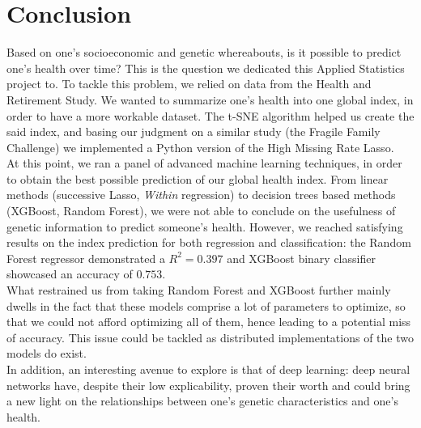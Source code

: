 \documentclass[]{article}
\begin{document}
\section{Conclusion}
Based on one's socioeconomic and genetic whereabouts, is it possible to predict one's health over time? This is the question we dedicated this Applied Statistics project to. To tackle this problem, we relied on data from the Health and Retirement Study. We wanted to summarize one's health into one global index, in order to have a more workable dataset. The t-SNE algorithm helped us create the said index, and basing our judgment on a similar study (the Fragile Family Challenge) we implemented a Python version of the High Missing Rate Lasso.\\
At this point, we ran a panel of advanced machine learning techniques, in order to obtain the best possible prediction of our global health index. From linear methods (successive Lasso, \textit{Within}  regression) to decision trees based methods (XGBoost, Random Forest), we were not able to conclude on the usefulness of genetic information to predict someone's health. However, we reached satisfying results on the index prediction for both regression  and classification: the Random Forest regressor demonstrated a $R^2=0.397$ and XGBoost binary classifier showcased an accuracy of $0.753$.\\

\noindent
What restrained us from taking Random Forest and XGBoost further mainly dwells in the fact that these models comprise a lot of parameters to optimize, so that we could not afford optimizing all of them, hence leading to a potential miss of accuracy. This issue could be tackled as distributed implementations of the two models do exist.\\

\noindent
In addition, an interesting avenue to explore is that of deep learning: deep neural networks have, despite their low explicability, proven their worth and could bring a new light on the relationships between one's genetic characteristics and one's health.


\cleardoublepage


\end{document}
